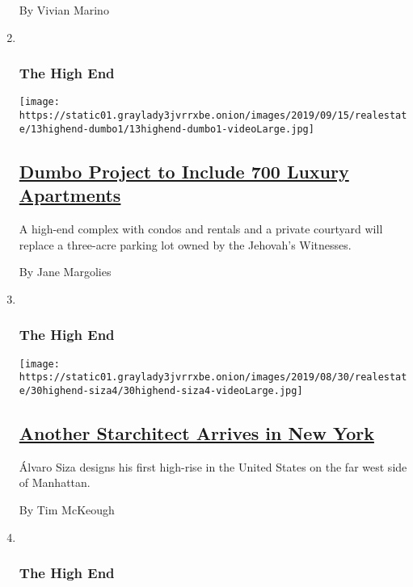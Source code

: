 \begin{enumerate}
  By Vivian Marino
\item ~
  \hypertarget{the-high-end-1}{%
  \subsubsection{The High End}\label{the-high-end-1}}

  \texttt{[image: https://static01.graylady3jvrrxbe.onion/images/2019/09/15/realestate/13highend-dumbo1/13highend-dumbo1-videoLarge.jpg]}

  \hypertarget{dumbo-project-to-include-700-luxury-apartments}{%
  \subsection{\texorpdfstring{\href{/2019/09/13/realestate/dumbo-brooklyn-condos-on-former-jehovahs-witness-parking-lot.html}{Dumbo
  Project to Include 700 Luxury
  Apartments}}{Dumbo Project to Include 700 Luxury Apartments}}\label{dumbo-project-to-include-700-luxury-apartments}}

  A high-end complex with condos and rentals and a private courtyard
  will replace a three-acre parking lot owned by the Jehovah's
  Witnesses.

  By Jane Margolies
\item ~
  \hypertarget{the-high-end-2}{%
  \subsubsection{The High End}\label{the-high-end-2}}

  \texttt{[image: https://static01.graylady3jvrrxbe.onion/images/2019/08/30/realestate/30highend-siza4/30highend-siza4-videoLarge.jpg]}

  \hypertarget{another-starchitect-arrives-in-new-york}{%
  \subsection{\texorpdfstring{\href{/2019/08/30/realestate/another-starchitect-arrives-in-new-york.html}{Another
  Starchitect Arrives in New
  York}}{Another Starchitect Arrives in New York}}\label{another-starchitect-arrives-in-new-york}}

  Álvaro Siza designs his first high-rise in the United States on the
  far west side of Manhattan.

  By Tim McKeough
\item ~
  \hypertarget{the-high-end-3}{%
  \subsubsection{The High End}\label{the-high-end-3}}


\end{enumerate}
